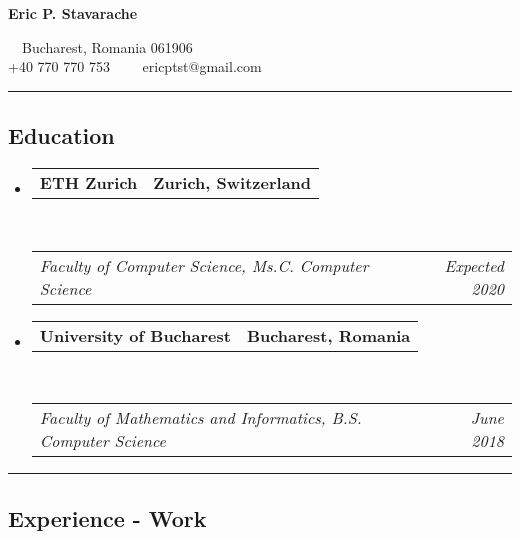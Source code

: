 \documentclass[10pt,letterpaper]{article}
\makeatletter
\newcommand{\headerrow}[2]
{\begin{tabular*}{\linewidth}{l@{\extracolsep{\fill}}r}
	#1 &
	#2 \\
\end{tabular*}}
\makeatother
\begin{document}
\begin{center}
{\LARGE \textbf{Eric P. Stavarache}}

\ \ Bucharest, Romania 061906
\\
+40 770 770 753\ \ \textbullet
\ \ ericptst@gmail.com
\end{center}

\hrule
\vspace{-0.4em}

\subsection*{Education}

\begin{itemize}
	\parskip=0.1em

	\item
	\headerrow
		{\textbf{ETH Zurich}}
		{\textbf{Zurich, Switzerland}}
	\\
	\headerrow
		{\emph{Faculty of Computer Science, Ms.C. Computer Science}}
		{\emph{Expected 2020}}

	\item
	\headerrow
		{\textbf{University of Bucharest}}
		{\textbf{Bucharest, Romania}}
	\\
	\headerrow
		{\emph{Faculty of Mathematics and Informatics, B.S. Computer Science}}
		{\emph{June 2018}}

\end{itemize}

\hrule
\vspace{-0.4em}
\subsection*{Experience - Work}
\end{document}
